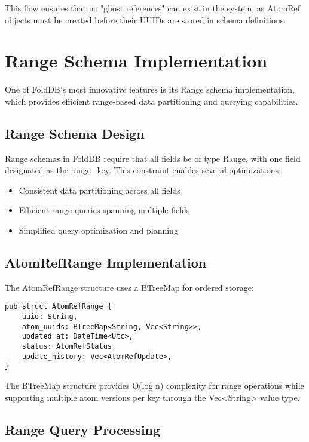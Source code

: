 \documentclass[11pt,a4paper]{article}
\begin{document}
This flow ensures that no "ghost references" can exist in the system, as AtomRef objects must be created before their UUIDs are stored in schema definitions.

\section{Range Schema Implementation}

One of FoldDB's most innovative features is its Range schema implementation, which provides efficient range-based data partitioning and querying capabilities.

\subsection{Range Schema Design}

Range schemas in FoldDB require that all fields be of type Range, with one field designated as the range\_key. This constraint enables several optimizations:

\begin{itemize}
\item Consistent data partitioning across all fields
\item Efficient range queries spanning multiple fields
\item Simplified query optimization and planning
\end{itemize}

\subsection{AtomRefRange Implementation}

The AtomRefRange structure uses a BTreeMap for ordered storage:

\begin{lstlisting}[caption=AtomRefRange Structure]
pub struct AtomRefRange {
    uuid: String,
    atom_uuids: BTreeMap<String, Vec<String>>,
    updated_at: DateTime<Utc>,
    status: AtomRefStatus,
    update_history: Vec<AtomRefUpdate>,
}
\end{lstlisting}

The BTreeMap structure provides O(log n) complexity for range operations while supporting multiple atom versions per key through the Vec<String> value type.

\subsection{Range Query Processing}
\end{document}
